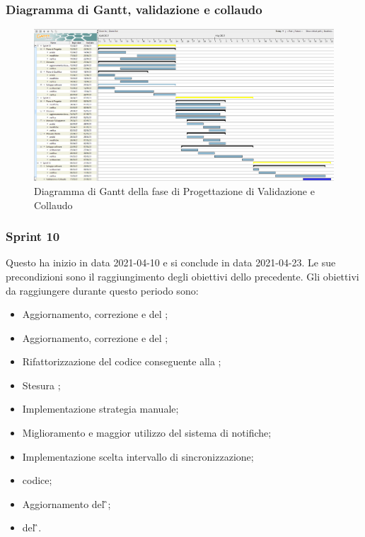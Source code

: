 \subsubsection{Diagramma di Gantt, validazione e collaudo}
\begin{figure}[H]
    \centering
    \includegraphics[scale = 0.33]{components/img/validazione_collaudo.png}
    \caption{Diagramma di Gantt della fase di Progettazione di Validazione e Collaudo}
    \label{fig:Diagramma di Gantt, fase di validazione e collaudo}
\end{figure}
\subsubsection{Sprint 10}
Questo  ha inizio in data 2021-04-10 e si conclude in data 2021-04-23. Le sue precondizioni sono il raggiungimento degli obiettivi dello  precedente.\newline{}
Gli obiettivi da raggiungere durante questo periodo sono:
\begin{itemize}
	\item Aggiornamento, correzione e  del \PdP{};
	\item Aggiornamento, correzione e  del \PdQ{};
	\item Rifattorizzazione del codice conseguente alla \PB{};
	\item Stesura ;
	\item Implementazione strategia manuale;
	\item Miglioramento e maggior utilizzo del sistema di notifiche;
	\item Implementazione scelta intervallo di sincronizzazione;
	\item {} codice;
	\item Aggiornamento del \G{};
	\item {} del \G{}.
\end{itemize}
